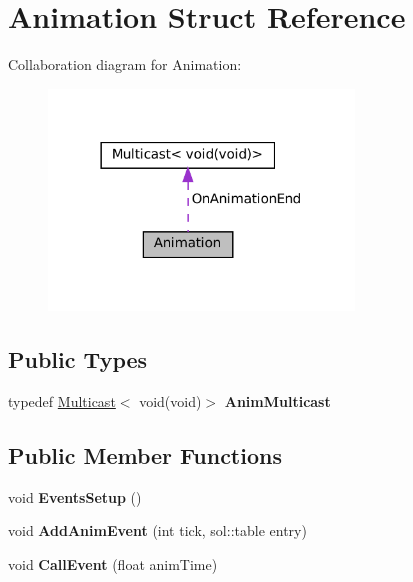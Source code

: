 \hypertarget{structAnimation}{}\section{Animation Struct Reference}
\label{structAnimation}


Collaboration diagram for Animation\+:\nopagebreak
\begin{figure}[H]
\begin{center}
\leavevmode
\includegraphics[width=230pt]{structAnimation__coll__graph}
\end{center}
\end{figure}
\subsection*{Public Types}
\begin{DoxyCompactItemize}
\item 
\mbox{\label{structAnimation_ac07104f8333840b8c2fca7fe620ace19}} 
typedef \hyperlink{classMulticast}{Multicast}$<$ void(void)$>$ {\bfseries Anim\+Multicast}
\end{DoxyCompactItemize}
\subsection*{Public Member Functions}
\begin{DoxyCompactItemize}
\item 
\mbox{\label{structAnimation_ae4eef1e6d0194258f4bf2a6bbcc874f5}} 
void {\bfseries Events\+Setup} ()
\item 
\mbox{\label{structAnimation_a0b4ff938810fc4f137b004b2a04d3c1d}} 
void {\bfseries Add\+Anim\+Event} (int tick, sol\+::table entry)
\item 
\mbox{\label{structAnimation_a4bfa0e66492903e4435233193ad4979a}} 
void {\bfseries Call\+Event} (float anim\+Time)
\end{DoxyCompactItemize}
